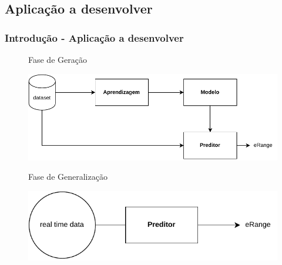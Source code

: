 \documentclass{beamer}
\begin{document}
\subsection[Aplicação a desenvolver]{Aplicação a desenvolver}
\begin{frame}
\frametitle{Introdução - Aplicação a desenvolver}
\vspace{0.5cm}
\begin{figure}[H]
	{Fase de Geração}
	\begin{center}
		\includegraphics[scale=0.6]{./figures/objetivo_fase_de_geracao.pdf}
	\end{center}
\end{figure}

\begin{figure}[H]
	{Fase de Generalização}
	\begin{center}
		\includegraphics[scale=0.6]{./figures/objetivo_fase_de_generalizacao.pdf}
	\end{center}
\end{figure}

		





\end{frame}
\end{document}
